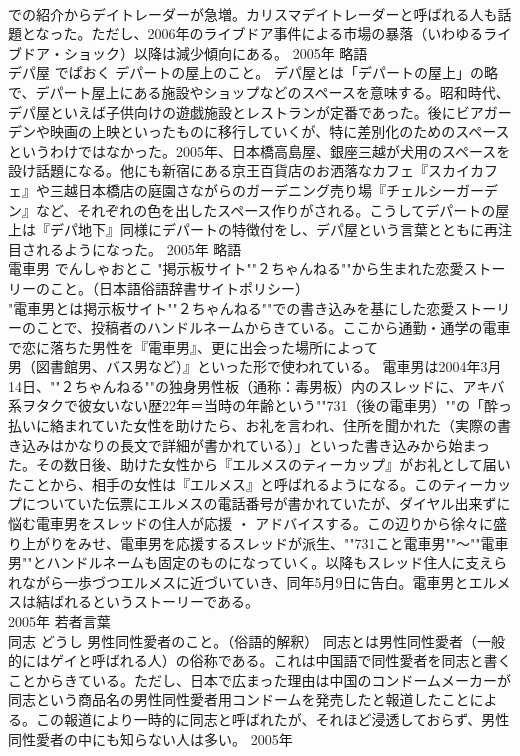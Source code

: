 \documentclass[8pt]{extreport}
\begin{document}
\begin{CJK}{UTF8}{min}
\\	での紹介からデイトレーダーが急増。カリスマデイトレーダーと呼ばれる人も話題となった。ただし、2006年のライブドア事件による市場の暴落（いわゆるライブドア・ショック）以降は減少傾向にある。	2005年	略語	
\\	デパ屋	でぱおく	デパートの屋上のこと。	デパ屋とは「デパートの屋上」の略で、デパート屋上にある施設やショップなどのスペースを意味する。昭和時代、デパ屋といえば子供向けの遊戯施設とレストランが定番であった。後にビアガーデンや映画の上映といったものに移行していくが、特に差別化のためのスペースというわけではなかった。2005年、日本橋高島屋、銀座三越が犬用のスペースを設け話題になる。他にも新宿にある京王百貨店のお洒落なカフェ『スカイカフェ』や三越日本橋店の庭園さながらのガーデニング売り場『チェルシーガーデン』など、それぞれの色を出したスペース作りがされる。こうしてデパートの屋上は『デパ地下』同様にデパートの特徴付をし、デパ屋という言葉とともに再注目されるようになった。	2005年	略語	
\\	電車男	でんしゃおとこ	"掲示板サイト""２ちゃんねる""から生まれた恋愛ストーリーのこと。（日本語俗語辞書サイトポリシー）
\\	"電車男とは掲示板サイト""２ちゃんねる""での書き込みを基にした恋愛ストーリーのことで、投稿者のハンドルネームからきている。ここから通勤・通学の電車で恋に落ちた男性を『電車男』、更に出会った場所によって
\\	男（図書館男、バス男など）』といった形で使われている。 電車男は2004年3月14日、""２ちゃんねる""の独身男性板（通称：毒男板）内のスレッドに、アキバ系ヲタクで彼女いない歴22年＝当時の年齢という""731（後の電車男）""の「酔っ払いに絡まれていた女性を助けたら、お礼を言われ、住所を聞かれた（実際の書き込みはかなりの長文で詳細が書かれている）」といった書き込みから始まった。その数日後、助けた女性から『エルメスのティーカップ』がお礼として届いたことから、相手の女性は『エルメス』と呼ばれるようになる。このティーカップについていた伝票にエルメスの電話番号が書かれていたが、ダイヤル出来ずに悩む電車男をスレッドの住人が応援 ・ アドバイスする。この辺りから徐々に盛り上がりをみせ、電車男を応援するスレッドが派生、""731こと電車男""～""電車男""とハンドルネームも固定のものになっていく。以降もスレッド住人に支えられながら一歩づつエルメスに近づいていき、同年5月9日に告白。電車男とエルメスは結ばれるというストーリーである。
\\	2005年	若者言葉	
\\	同志	どうし	男性同性愛者のこと。（俗語的解釈）	同志とは男性同性愛者（一般的にはゲイと呼ばれる人）の俗称である。これは中国語で同性愛者を同志と書くことからきている。ただし、日本で広まった理由は中国のコンドームメーカーが同志という商品名の男性同性愛者用コンドームを発売したと報道したことによる。この報道により一時的に同志と呼ばれたが、それほど浸透しておらず、男性同性愛者の中にも知らない人は多い。	2005年	

\end{CJK}
\end{document}
